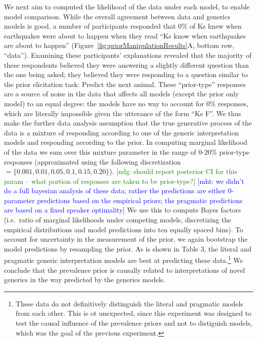 \documentclass[floatsintext,doc]{apa6}
\let\rmarkdownfootnote\footnote%
\def\footnote{\protect\rmarkdownfootnote}
\newcommand{\mht}[1]{{\textcolor{Blue}{[mht: #1]}}}
\newcommand{\ndg}[1]{{\textcolor{Green}{[ndg: #1]}}}
\begin{document}
We next aim to computed the likelihood of the data under each model, to enable model comparison.
While the overall agreement between data and generics models is good, a number of participants responded that 0\% of Ks knew when earthquakes were about to happen when they read \enquote{Ks know when earthquakes are about to happen} (Figure~\ref{fig:priorManipulationResults}A, bottom row, \enquote{data}).
Examining these participants' explanations revealed that the majority of these respondents believed they were answering a slightly different question than the one being asked; they believed they were responding to a question similar to the prior elicitation task: Predict the next animal.
These \enquote{prior-type} responses are a source of noise in the data that affects all models (except the prior only model) to an equal degree: the models have no way to account for 0\% responses, which are literally impossible given the utterance of the form \enquote{Ks F}.
We thus make the further data analysis assumption that the true generative process of the data is a mixture of responding according to one of the generic interpretation models and responding according to the prior.
In computing marginal likelihood of the data we sum over this mixture parameter in the range of 0-20\% prior-type responses (approximated using the following discretization \(= \{0.001, 0.01, 0.05, 0.1, 0.15, 0.20\}\)).
\ndg{should report posterior CI for this param -- what portion of responses are taken to be prior-type?}
\mht{we didn't do a full bayesian analysis of these data; rather the predictions are either 0-parameter predictions based on the empirical priors; the pragmatic predictions are based on a fixed speaker optimality}
We use this to compute Bayes factors (i.e.~ratio of marginal likelihoods under competing models, discretizing the empirical distributions and model predictions into ten equally spaced bins).
To account for uncertainty in the measurement of the prior, we again bootstrap the model predictions by resampling the prior.
As is shown in Table 3, the literal and pragmatic generic interpretation models are best at predicting these data.\footnote{These data do not definitively distinguish the literal and pragmatic models from each other. This is ot unexpected, since this experiment was designed to test the causal influence of the prevalence priors and not to distiguish models, which was the goal of the previous experiment.}
We conclude that the prevalence prior is causally related to interpretations of novel generics in the way predicted by the generics models.
\end{document}
